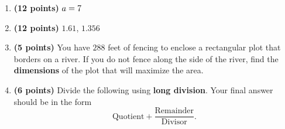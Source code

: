 \documentclass[12pt]{amsart}
\begin{document}
\begin{enumerate}
\item {\bf (12 points)} 
 $a = \a$ 
\vfill 
\def \a{7}\def \atwoone{2}\def \atwotwo{5}\def \atwothree{2}\def \btwothree{7}\def \sumtwothree{9}\def \diftwothree{-5}\def \bigtwothree{200}\def \powtwothree{49}\def \logtwothree{0.3562071871080222}\def \factortwothree{91}\def \atwofour{1.61}\def \btwofour{1.356}\def \tooshorttwofour{10.1}\def \moneytwofour{10.10}\def \longertwofour{10.10000}\def \atwofive{0.12}\def \btwofive{0.12346}\def \athreeone{6}\def \bthreeone{4}\def \setthreetwo{[3, 7, 7]}\def \athreetwo{3}\def \bthreetwo{7}\def \cthreetwo{7}\def \controlthreethree{-4}\def \athreethree{1}\def \topthreethree{1}\def \athreefour{5}\def \bthreefour{1}\def \listthreefour{[1, 2, 3, 4]}\def \afourone{4}\def \bfourone{-2}\def \fracfourone{-2}\def \rootfourtwo{20}\def \simplifiedfourtwo{2 \sqrt{5}}\def \sqrtlistfourtwo{[2, 5]}\def \outfourtwo{2}\def \infourtwo{5}\def \wowfourtwo{1}\def \afourthree{-5}\def \nicethreefour{3x^{2}-x^{}-5}\def \nastythreefour{xyz^{3}-5}\def \cfourthree{4}\def \dfourthree{-10}\def \infourthree{4x^{}}\def \outfourthree{-10y^{}}\def \afourfour{1144765}\def \nicefourfour{1,144,765}\def \goodfourfour{1,000,000.12345}\def \badfourfour{1,000,000.1}
\item {\bf (12 points)} 
 $\atwofour$, $\btwofour$ 
\vfill 
\newpage\def \x{72}\def \y{144}\def \L{288}\def \area{10368}
\item {\bf (5 points)} 
 You have $\L$ feet of fencing to enclose a rectangular plot that borders on a river. If you do not fence along the side of the river, find the \textbf{dimensions} of the plot that will maximize the area. \\

  
\vfill \vfill \vfill
\def \a{7}\def \b{4}\def \c{-6}\def \r{12}\def \monicpol{x^{}+7}\def \longnbad{4x^{2}+22x^{}-30}\def \anspol{4x^{}-6}
\item {\bf (6 points)} 
 Divide the following using {\bf long division}. Your final answer should be in the form $$ \text{Quotient} + \dfrac{\text{Remainder}}{\text{Divisor}}.$$

\vspace{3mm}


\end{enumerate}
\end{document}
